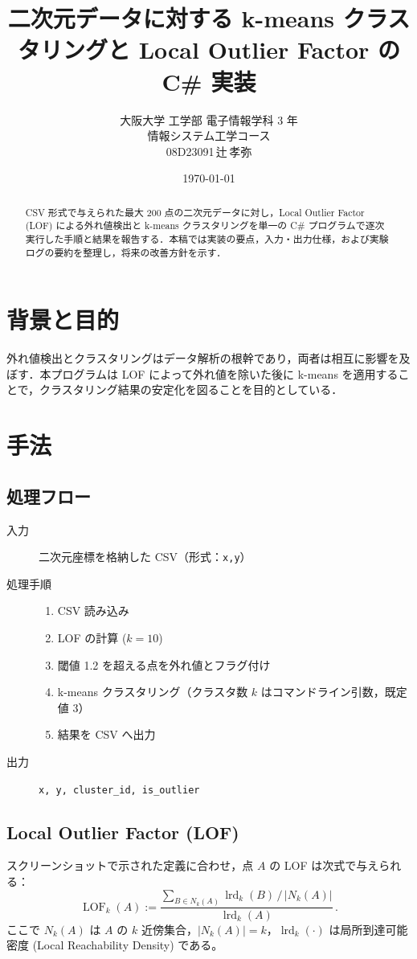 \documentclass[a4j,dvipdfmx]{jsarticle}
\title{二次元データに対する k-means クラスタリングと Local Outlier Factor の C\# 実装}
\author{大阪大学 工学部 電子情報学科 3 年\\情報システム工学コース\\08D23091\,辻\,孝弥}
\date{\today}
\begin{document}
\maketitle
\tableofcontents
\newpage

\begin{abstract}
CSV 形式で与えられた最大 200 点の二次元データに対し，Local Outlier Factor (LOF) による外れ値検出と k-means クラスタリングを単一の C\# プログラムで逐次実行した手順と結果を報告する．本稿では実装の要点，入力・出力仕様，および実験ログの要約を整理し，将来の改善方針を示す．
\end{abstract}

\section{背景と目的}
外れ値検出とクラスタリングはデータ解析の根幹であり，両者は相互に影響を及ぼす．本プログラムは LOF によって外れ値を除いた後に k-means を適用することで，クラスタリング結果の安定化を図ることを目的としている．

\section{手法}
\subsection{処理フロー}
\begin{description}
  \item[入力] 二次元座標を格納した CSV（形式：\texttt{x,y}）
  \item[処理手順]
    \begin{enumerate}
      \item CSV 読み込み
      \item LOF の計算 ($k=10$)
      \item 閾値 1.2 を超える点を外れ値とフラグ付け
      \item k-means クラスタリング（クラスタ数 $k$ はコマンドライン引数，既定値 3）
      \item 結果を CSV へ出力
    \end{enumerate}
  \item[出力] \texttt{x, y, cluster\_id, is\_outlier}
\end{description}

\subsection{Local Outlier Factor (LOF)}
スクリーンショットで示された定義に合わせ，点 $A$ の LOF は次式で与えられる：
\begin{equation}
  \operatorname{LOF}_k(A)
  :=
  \frac{\displaystyle\sum_{B\in N_k(A)} \operatorname{lrd}_k(B) \,/\, |N_k(A)|}
       {\operatorname{lrd}_k(A)}\,.
  \label{eq:lof}
\end{equation}
ここで $N_k(A)$ は $A$ の $k$ 近傍集合，$|N_k(A)|=k$，$\operatorname{lrd}_k(\cdot)$ は局所到達可能密度 (Local Reachability Density) である。
\end{document}
